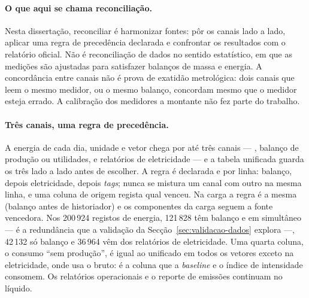 \paragraph{O que aqui se chama reconciliação.} Nesta dissertação,
reconciliar é harmonizar fontes: pôr os canais lado a lado, aplicar uma
regra de precedência declarada e confrontar os resultados com o relatório
oficial. Não é reconciliação de dados no sentido estatístico, em que as
medições são ajustadas para satisfazer balanços de massa e
energia.
 A concordância entre canais não é prova de exatidão
metrológica: dois canais
que leem o mesmo medidor, ou o mesmo balanço, concordam mesmo que o medidor
esteja errado. A calibração dos medidores a montante não fez parte do
trabalho.

\paragraph{Três canais, uma regra de precedência.} A energia de cada
dia, unidade e vetor chega por até três canais --- ,
balanço de produção ou utilidades, e relatórios de eletricidade --- e a tabela unificada guarda os três lado a lado antes de
escolher. A regra é declarada e por linha: balanço, depois eletricidade,
depois \emph{tags}; nunca se mistura um canal com outro na mesma linha, e
uma coluna de origem regista qual venceu. Na carga a regra é a mesma
(balanço antes de historiador) e os componentes da carga seguem a fonte
vencedora. Nos 200\,924 registos de energia, 121\,828 têm balanço e
 em simultâneo --- é a redundância que a validação da
Secção~\ref{sec:validacao-dados} explora ---, 42\,132 só balanço e 36\,964
vêm dos relatórios de eletricidade. Uma quarta coluna, o consumo ``sem
produção'', é igual ao unificado em todos os vetores exceto na
eletricidade, onde usa o bruto: é a coluna que a \emph{baseline} e o índice
de intensidade consomem. Os relatórios operacionais e o reporte de
emissões continuam no líquido.

